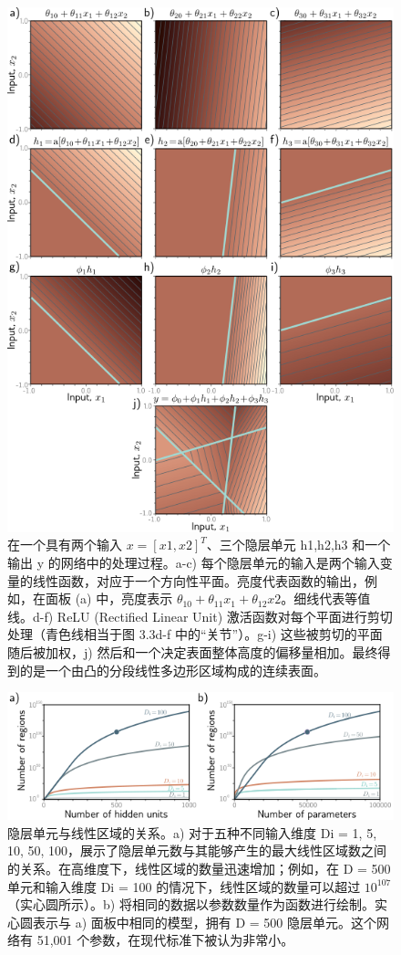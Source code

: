 \begin{figure}[ht!]
	\centering
	\includegraphics[width=0.7\linewidth]{png/chapter3/ShallowBuildUp2D.png}
\caption{在一个具有两个输入 \(x = [x1,x2]^T\)、三个隐层单元 h1,h2,h3 和一个输出 y 的网络中的处理过程。a-c) 每个隐层单元的输入是两个输入变量的线性函数，对应于一个方向性平面。亮度代表函数的输出，例如，在面板 (a) 中，亮度表示 \(\theta_10 + \theta_{11}x_1 + \theta_{12} x2\)。细线代表等值线。d-f) ReLU (Rectified Linear Unit) 激活函数对每个平面进行剪切处理（青色线相当于图 3.3d-f 中的“关节”）。g-i) 这些被剪切的平面随后被加权，j) 然后和一个决定表面整体高度的偏移量相加。最终得到的是一个由凸的分段线性多边形区域构成的连续表面。}
\end{figure}

\begin{figure}[ht!]
	\centering
	\includegraphics[width=0.7\linewidth]{png/chapter3/ShallowRegions.png}
\caption{隐层单元与线性区域的关系。a) 对于五种不同输入维度 Di = {1, 5, 10, 50, 100}，展示了隐层单元数与其能够产生的最大线性区域数之间的关系。在高维度下，线性区域的数量迅速增加；例如，在 D = 500 单元和输入维度 Di = 100 的情况下，线性区域的数量可以超过 $10^107$（实心圆所示）。b) 将相同的数据以参数数量作为函数进行绘制。实心圆表示与 a) 面板中相同的模型，拥有 D = 500 隐层单元。这个网络有 51,001 个参数，在现代标准下被认为非常小。}
\end{figure}


